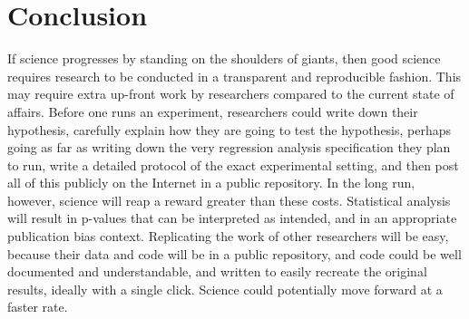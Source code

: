 \documentclass[12pt] {article}
\begin{document}
\section{Conclusion}\label{conclusion}

If science progresses by standing on the shoulders of giants, then good science requires research to be conducted in a transparent and reproducible fashion. This may require extra up-front work by researchers compared to the current state of affairs. Before one runs an experiment, researchers could write down their hypothesis, carefully explain how they are going to test the hypothesis, perhaps going as far as writing down the very regression analysis specification they plan to run, write a detailed protocol of the exact experimental setting, and then post all of this publicly on the Internet in a public repository. In the long run, however, science will reap a reward greater than these costs. Statistical analysis will result in p-values that can be interpreted as intended, and in an appropriate publication bias context. Replicating the work of other researchers will be easy, because their data and code will be in a public repository, and code could be well documented and understandable, and written to easily recreate the original results, ideally with a single click. Science could potentially move forward at a faster rate.

\newpage

\theendnotes


\newpage
\singlespacing


\end{document}
